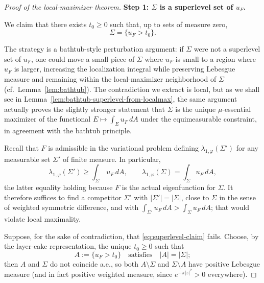 \documentclass[a4paper,11pt,reqno]{amsart}
\numberwithin{equation}{section}
\theoremstyle{plain} %
\theoremstyle{definition} %
\theoremstyle{remark}
\begin{document}
\begin{proof}[Proof of the local-maximizer theorem]
\medskip
\noindent
{\bf Step 1: \(\Sigma\) is a superlevel set of \(u_F\).}\label{step:superlevel}

We claim that there exists \(t_0\ge 0\) such that, up to sets of measure zero,
\begin{equation}\label{eq:superlevel-claim}
\Sigma=\{u_F>t_0\}.
\end{equation}

The strategy is a bathtub-style perturbation argument: if \(\Sigma\) were not a
superlevel set of \(u_F\), one could move a small piece of \(\Sigma\) where
\(u_F\) is small to a region where \(u_F\) is larger, increasing the
localization integral while preserving Lebesgue measure and remaining within
the local-maximizer neighborhood of \(\Sigma\) (cf.\ Lemma~\ref{lem:bathtub}).
The contradiction we extract is local, but as we shall see in
Lemma~\ref{lem:bathtub-superlevel-from-localmax}, the same argument actually
proves the slightly stronger statement that \(\Sigma\) is the unique
\(\mu\)-essential maximizer of the functional \(E\mapsto \int_E u_F\,dA\)
under the equimeasurable constraint, in agreement with the bathtub principle.

Recall that \(F\) is admissible in the variational problem defining
\(\lambda_{1,\varphi}(\Sigma')\) for any measurable set \(\Sigma'\) of finite
measure. In particular,
\[
\lambda_{1,\varphi}(\Sigma')\ge \int_{\Sigma'} u_F\,dA,
\qquad
\lambda_{1,\varphi}(\Sigma)= \int_\Sigma u_F\,dA,
\]
the latter equality holding because \(F\) is the actual eigenfunction for
\(\Sigma\). It therefore suffices to find a competitor \(\Sigma'\) with
\(|\Sigma'|=|\Sigma|\), close to \(\Sigma\) in the sense of weighted symmetric
difference, and with \(\int_{\Sigma'} u_F\,dA>\int_\Sigma u_F\,dA\); that would
violate local maximality.

Suppose, for the sake of contradiction, that \eqref{eq:superlevel-claim} fails.
Choose, by the layer-cake representation, the unique \(t_0\ge 0\) such that
\[
A:=\{u_F>t_0\}\quad\text{satisfies}\quad |A|=|\Sigma|;
\]
then \(A\) and \(\Sigma\) do not coincide a.e., so both \(A\setminus\Sigma\) and
\(\Sigma\setminus A\) have positive Lebesgue measure (and in fact positive
weighted measure, since \(e^{-\pi|z|^2}>0\) everywhere).


\end{proof}
\end{document}
